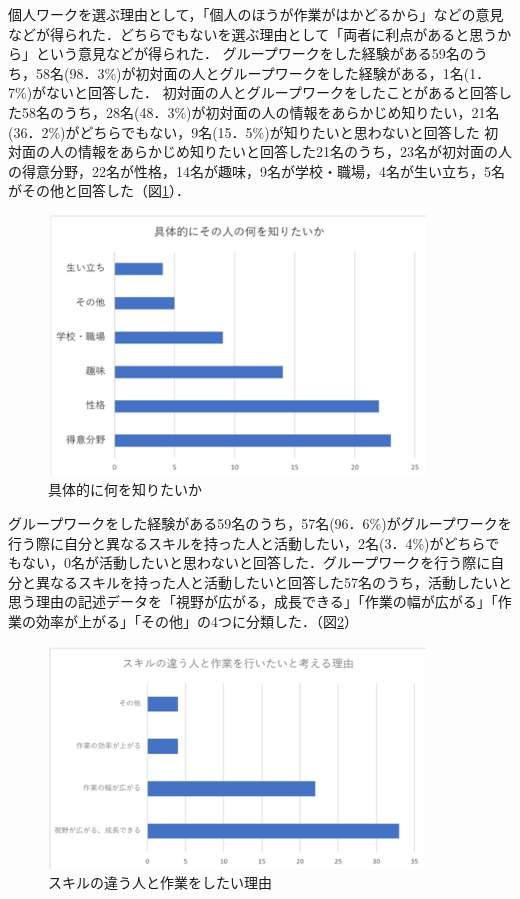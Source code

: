 \documentclass{funthesis}
\begin{document}
個人ワークを選ぶ理由として，「個人のほうが作業がはかどるから」などの意見などが得られた．どちらでもないを選ぶ理由として「両者に利点があると思うから」という意見などが得られた．
グループワークをした経験がある59名のうち，58名(98．3\%)が初対面の人とグループワークをした経験がある，1名(1．7\%)がないと回答した．
初対面の人とグループワークをしたことがあると回答した58名のうち，28名(48．3\%)が初対面の人の情報をあらかじめ知りたい，21名(36．2\%)がどちらでもない，9名(15．5\%)が知りたいと思わないと回答した 
初対面の人の情報をあらかじめ知りたいと回答した21名のうち，23名が初対面の人の得意分野，22名が性格，14名が趣味，9名が学校・職場，4名が生い立ち，5名がその他と回答した（図\ref{graph2}）．

\begin{figure}[H]
 \centering
   \includegraphics[width=100mm]{figures/graph2.png}
 \caption{具体的に何を知りたいか}
 \label{graph2}
\end{figure}

グループワークをした経験がある59名のうち，57名(96．6\%)がグループワークを行う際に自分と異なるスキルを持った人と活動したい，2名(3．4\%)がどちらでもない，0名が活動したいと思わないと回答した．グループワークを行う際に自分と異なるスキルを持った人と活動したいと回答した57名のうち，活動したいと思う理由の記述データを「視野が広がる，成長できる」「作業の幅が広がる」「作業の効率が上がる」「その他」の4つに分類した．（図\ref{graph3}）

\begin{figure}[H]
 \centering
   \includegraphics[width=100mm]{figures/graph3.png}
 \caption{スキルの違う人と作業をしたい理由}
 \label{graph3}
\end{figure}
\end{document}
